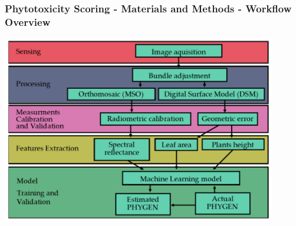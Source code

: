 \documentclass[aspectratio=43]{beamer}
\begin{document}

\begin{frame}
    \frametitle{\small Phytotoxicity Scoring - Materials and Methods - Workflow Overview}
    
    \begin{center}
        \includegraphics[width=0.9\textwidth]{Imgs/agronomy-14-00306-g003.png}
    \end{center}
\end{frame}
\end{document}
